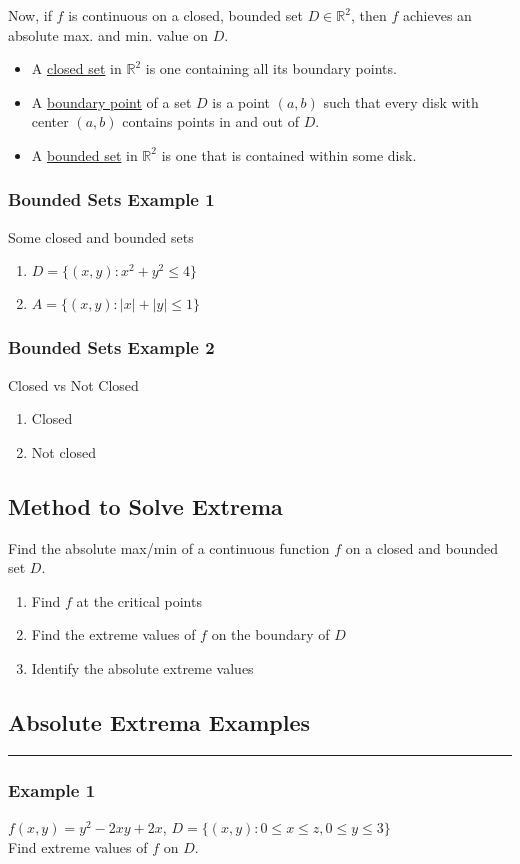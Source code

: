 \documentclass[12pt]{article}
\begin{document}
Now, if \(f\) is continuous on a closed, bounded set \(D \in \mathbb{R}^2\), then \(f\)  achieves an absolute max. and min. value on \(D\).  
\begin{itemize}
	\item A \underline{closed set} in \(\mathbb{R}^2 \) is one containing all its boundary points.
	\item A \underline{boundary point} of a set \(D\)  is a point \((a,b)\) such that every disk with center \((a,b)\) contains points in and out of \(D\). 
	\item A \underline{bounded set} in \(\mathbb{R}^2\) is one that is contained within some disk.
\end{itemize}

\subsubsection{Bounded Sets Example 1}
Some closed and bounded sets
\begin{enumerate}
	\item  \(D=\{(x,y): x^2 + y^2 \leq 4\}\) 
	\item \(A = \{(x,y): |x| + |y| \leq 1\}\) 
\end{enumerate}

\subsubsection{Bounded Sets Example 2}
Closed vs Not Closed
\begin{enumerate}
	\item Closed
	\item Not closed
\end{enumerate}

\subsection{Method to Solve Extrema}
Find the absolute max/min of a continuous function \(f\) on a closed and bounded set \(D\). 
\begin{enumerate}
	\item Find \(f\) at the critical points
	\item Find the extreme values of \(f\) on the boundary of \(D\) 
	\item Identify the absolute extreme values
\end{enumerate}

\subsection{Absolute Extrema Examples}
\rule{\textwidth}{0.1mm}

\subsubsection{Example 1}
\(f(x,y) = y^2 - 2xy + 2x\), \(D = \{(x,y): 0 \leq x \leq z, 0 \leq y \leq 3\}\) \\
Find extreme values of \(f\) on \(D\). 
\end{document}
